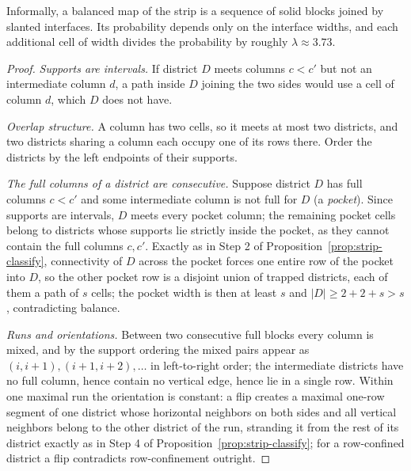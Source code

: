 \documentclass[11pt]{article}
\begin{document}
Informally, a balanced map of the strip is a sequence of solid blocks
joined by slanted interfaces. Its probability depends only on the
interface widths, and each additional cell of width divides the
probability by roughly $\lambda \approx 3.73$.

\begin{proof}
\emph{Supports are intervals.} If district $D$ meets columns $c < c'$
but not an intermediate column $d$, a path inside $D$ joining the two
sides would use a cell of column $d$, which $D$ does not have.

\emph{Overlap structure.} A column has two cells, so it meets at most
two districts, and two districts sharing a column each occupy one of its
rows there. Order the districts by the left endpoints of their supports.

\emph{The full columns of a district are consecutive.} Suppose district
$D$ has full columns $c < c'$ and some intermediate column is not full
for $D$ (a \emph{pocket}). Since supports are intervals, $D$ meets every
pocket column; the remaining pocket cells belong to districts whose
supports lie strictly inside the pocket, as they cannot contain the full
columns $c, c'$. Exactly as in Step 2 of
Proposition~\ref{prop:strip-classify}, connectivity of $D$ across the
pocket forces one entire row of the pocket into $D$, so the other pocket
row is a disjoint union of trapped districts, each of them a path of $s$
cells; the pocket width is then at least $s$ and
$|D| \ge 2 + 2 + s > s$, contradicting balance.

\emph{Runs and orientations.} Between two consecutive full blocks every
column is mixed, and by the support ordering the mixed pairs appear as
$(i, i+1), (i+1, i+2), \ldots$ in left-to-right order; the intermediate
districts have no full column, hence contain no vertical edge, hence lie
in a single row. Within one maximal run the orientation is constant: a
flip creates a maximal one-row segment of one district whose horizontal
neighbors on both sides and all vertical neighbors belong to the other
district of the run, stranding it from the rest of its district exactly
as in Step 4 of Proposition~\ref{prop:strip-classify}; for a
row-confined district a flip contradicts row-confinement outright.


\end{proof}
\end{document}
